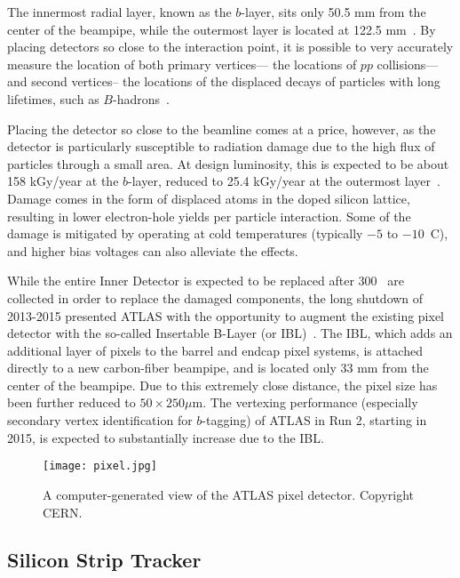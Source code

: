 The innermost radial layer, known as the $b$-layer, sits only 50.5 mm from the center of the beampipe, while the outermost layer is located at 122.5 mm~\cite{ATLASPaper}. By placing detectors so close to the interaction point, it is possible to very accurately measure the location of both  primary vertices--- the locations of $pp$ collisions--- and second vertices-- the locations of the displaced decays of particles with long lifetimes, such as $B$-hadrons~\cite{ATLASExpected}.

Placing the detector so close to the beamline comes at a price, however, as the detector is particularly susceptible to radiation damage due to the high flux of particles through a small area. At design luminosity, this is expected to be about 158 kGy/year at the $b$-layer, reduced to 25.4 kGy/year at the outermost layer~\cite{ATLASPaper}. Damage comes in the form of displaced atoms in the doped silicon lattice, resulting in lower electron-hole yields per particle interaction. Some of the damage is mitigated by operating at cold temperatures (typically $-5$ to $-10$\degree~C), and higher bias voltages can also alleviate the effects.

While the entire Inner Detector is expected to be replaced after 300 \ifb~are collected in order to replace the damaged components, the long shutdown of 2013-2015 presented ATLAS with the opportunity to augment the existing pixel detector with the so-called Insertable B-Layer (or IBL)~\cite{ATLASIBL}. The IBL, which adds an additional layer of pixels to the barrel and endcap pixel systems, is attached directly to a new carbon-fiber beampipe, and is located only 33 mm from the center of the beampipe. Due to this extremely close distance, the pixel size has been further reduced to $50 \times 250 \mu$m. The vertexing performance (especially secondary vertex identification for $b$-tagging) of ATLAS in Run 2, starting in 2015, is expected to substantially increase due to the IBL. 


\begin{figure}
\centering
\texttt{[image: pixel.jpg]}
\label{fig:detector:pixel}
\caption{A computer-generated view of the ATLAS pixel detector. Copyright CERN.}
\end{figure}




\subsection{Silicon Strip Tracker}

